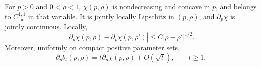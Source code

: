 \begin{theorem}\label{fp:thm:regularity}
For $p>0$ and $0<\rho<1$, $\chi(p,\rho)$ is nondecreasing and concave in $p$, and belongs to $C^{1,1}_{\mathrm{loc}}$ in that variable. It is jointly locally Lipschitz in $(p,\rho)$, and $\partial_p\chi$ is jointly continuous. Locally,
\begin{equation}\label{fp:eq:rho-holder}
 |\partial_p\chi(p,\rho)-\partial_p\chi(p,\rho')|
 \le C|\rho-\rho'|^{1/2}.
\end{equation}
Moreover, uniformly on compact positive parameter sets,
\begin{equation}\label{fp:eq:derivative-rate}
 \partial_pb_t(p,\rho)=t\partial_p\chi(p,\rho)+O(\sqrt t),
 \qquad t\ge1.
\end{equation}
\end{theorem}
